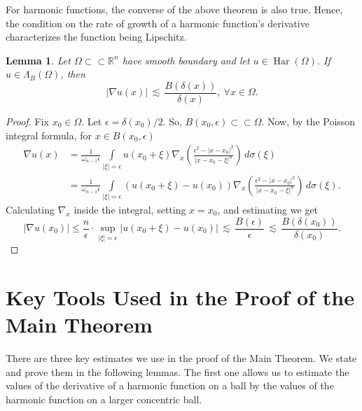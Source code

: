 \documentclass[12pt,a4paper]{amsart}
\numberwithin{equation}{section}
\newtheorem{lemma}[equation]{Lemma}
\theoremstyle{definition}
\begin{document}
For harmonic functions, the converse of the above theorem is also true. Hence, the condition on the rate of growth of a harmonic function's derivative characterizes the function being Lipschitz.
\begin{lemma} Let $\Omega\subset\subset\mathbb{R}^n$ have smooth boundary and let $u\in\operatorname{\operatorname{Har}}(\Omega)$. If $u\in\Lambda_B(\Omega)$, then
\[{\left\lvert{\nabla u(x)}\right\rvert}\, \lesssim\, \frac{B(\delta(x))}{\delta(x)},\ \forall x\in\Omega .\]
\end{lemma}
\begin{proof} Fix $x_0\in\Omega$. Let $\epsilon=\delta(x_0)/2$. So, $B(x_0,\epsilon) \subset\subset \Omega$. Now, by the Poisson integral formula, for $x\in B(x_0,\epsilon)$
\begin{align*}
\nabla u(x) &= \frac{1}{\omega_{n-1}\epsilon} \int\limits_{{\left\lvert{\xi}\right\rvert}=\epsilon} u\left(x_0+\xi\right) \nabla_x\left(\frac{\epsilon^2 - {\left\lvert{x-x_0}\right\rvert}^2}{{\left\lvert{x-x_0-\xi}\right\rvert}^n}\right)\, d\sigma(\xi)\\
&= \frac{1}{\omega_{n-1}\epsilon} \int\limits_{{\left\lvert{\xi}\right\rvert}=\epsilon} \left(u\left(x_0+\xi\right)-u(x_0)\right) \nabla_x\left(\frac{\epsilon^2 - {\left\lvert{x-x_0}\right\rvert}^2}{{\left\lvert{x-x_0-\xi}\right\rvert}^n}\right)\, d\sigma(\xi) .
\end{align*}
Calculating $\nabla_x$ inside the integral, setting $x=x_0$, and estimating we get
\[{\left\lvert{\nabla u(x_0)}\right\rvert} \le \frac{n}{\epsilon}\cdot\sup\limits_{{\left\lvert{\xi}\right\rvert}=\epsilon} {\left\lvert{u(x_0+\xi)-u(x_0)}\right\rvert}\, \lesssim\, \frac{B(\epsilon)}{\epsilon} \,\lesssim\, \frac{B(\delta(x_0))}{\delta(x_0)}.\]
\end{proof}

\section{Key Tools Used in the Proof of the Main Theorem}

There are three key estimates we use in the proof of the Main Theorem. We state and prove them in the following lemmas. The first one allows us to estimate the values of the derivative of a harmonic function 
on a ball by the values of the harmonic function on a larger concentric ball.
\end{document}
